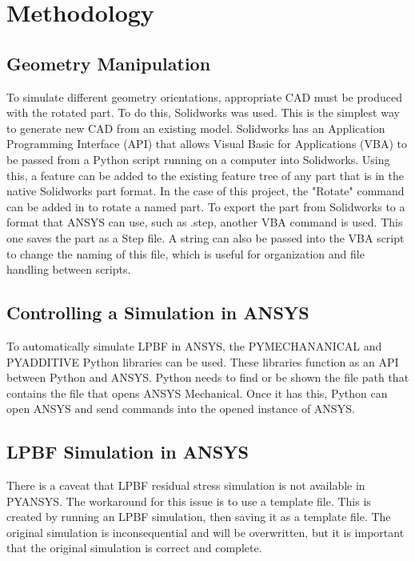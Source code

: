 \section{Methodology}

\subsection{Geometry Manipulation}
To simulate different geometry orientations, appropriate CAD must be produced with the rotated part.  To do this, Solidworks \cite{solidworks2024} was used.  This is the simplest way to generate new CAD from an existing model.
\newline \indent Solidworks has an Application Programming Interface (API) \cite{landry2022automatingSolidworksPython} that allows Visual Basic for Applications (VBA) to be passed from a Python script running on a computer into Solidworks.  Using this, a feature can be added to the existing feature tree of any part that is in the native Solidworks part format.  In the case of this project, the "Rotate" command can be added in to rotate a named part.
\newline \indent To export the part from Solidworks to a format that ANSYS can use, such as .step, another VBA command is used.  This one saves the part as a Step file.  A string can also be passed into the VBA script to change the naming of this file, which is useful for organization and file handling between scripts.
\subsection{Controlling a Simulation in ANSYS}
To automatically simulate LPBF in ANSYS, the PYMECHANANICAL and PYADDITIVE \cite{pymechanical2026} \cite{pyadditive2026} Python libraries can be used.  These libraries function as an API between Python and ANSYS.  Python needs to find or be shown the file path that contains the file that opens ANSYS Mechanical.  Once it has this, Python can open ANSYS and send commands into the opened instance of ANSYS.
\subsection{LPBF Simulation in ANSYS}
There is a caveat that LPBF residual stress simulation is not available in PYANSYS.  The workaround for this issue is to use a template file.  This is created by running an LPBF simulation, then saving it as a template file.  The original simulation is inconsequential and will be overwritten, but it is important that the original simulation is correct and complete.




